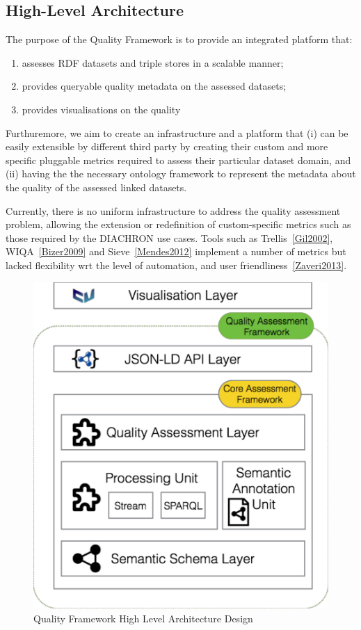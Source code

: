 
\subsection{High-Level Architecture}
\label{sec:HLA} 

The purpose of the Quality Framework is to provide an integrated platform that: 
\begin{enumerate}
\item assesses RDF datasets and triple stores in a scalable manner;
\item provides queryable quality metadata on the assessed datasets;
\item provides visualisations on the quality 
\end{enumerate}
Furthuremore, we aim to create an infrastructure and a platform that (i) can be easily extensible by different third party by creating their custom and more specific pluggable metrics required to assess their particular dataset domain, and (ii) having the the necessary ontology framework to represent the metadata about the quality of the assessed linked datasets.

Currently, there is no uniform infrastructure to address the quality assessment problem, allowing the extension or redefinition of custom-specific metrics such as those required by the DIACHRON use cases.
Tools such as Trellis~\ref{Gil2002}, WIQA~\ref{Bizer2009} and Sieve~\ref{Mendes2012} implement a number of metrics but lacked flexibility wrt the level of automation, and user friendliness~\ref{Zaveri2013}. 

\begin{figure}[tbph]
\center
\includegraphics[scale=0.3]{images/qualityFrameworkHLA.pdf} 
\caption{Quality Framework High Level Architecture Design} 
\label{fig:qualityFramework}
\end{figure}

